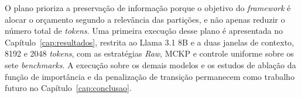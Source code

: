 O plano prioriza a preservação de informação porque o objetivo do \textit{framework} é alocar o orçamento segundo a relevância das partições, e não apenas reduzir o número total de \textit{tokens}. Uma primeira execução desse plano é apresentada no Capítulo~\ref{cap:resultados}, restrita ao Llama 3.1 8B e a duas janelas de contexto, 8192 e 2048 \textit{tokens}, com as estratégias \textit{Raw}, MCKP e controle uniforme sobre os sete \textit{benchmarks}. A execução sobre os demais modelos e os estudos de ablação da função de importância e da penalização de transição permanecem como trabalho futuro no Capítulo~\ref{cap:conclusao}.
